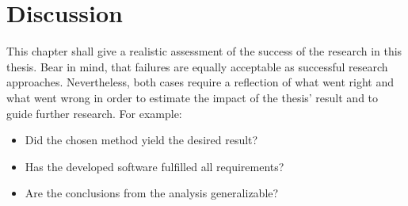 \chapter{Discussion}
This chapter shall give a realistic assessment of the success of the research in this thesis.
Bear in mind, that failures are equally acceptable as successful research approaches.
Nevertheless, both cases require a reflection of what went right and what went wrong in order to estimate the impact of the thesis' result and to guide further research.
For example:
\begin{itemize}
	\item Did the chosen method yield the desired result?
	\item Has the developed software fulfilled all requirements?
	\item Are the conclusions from the analysis generalizable?
\end{itemize}

